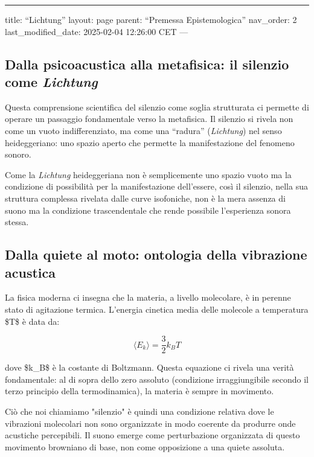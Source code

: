 \documentclass[a4paper,11pt]{article}
\begin{document}
\begin{center}
\rule{3in}{0.4pt}
\end{center}
title: ``Lichtung''
layout: page
parent: ``Premessa Epistemologica''
nav\_order: 2
last\_modified\_date: 2025-02-04 12:26:00 CET
---

\subsection{Dalla psicoacustica alla metafisica: il silenzio come \emph{Lichtung}}\hypertarget{dalla-psicoacustica-alla-metafisica-il-silenzio-come-lichtung}{}\label{dalla-psicoacustica-alla-metafisica-il-silenzio-come-lichtung}

Questa comprensione scientifica del silenzio come soglia strutturata ci
permette di operare un passaggio fondamentale verso la metafisica. Il
silenzio si rivela non come un vuoto indifferenziato, ma come una
``radura'' (\emph{Lichtung}) nel senso heideggeriano: uno spazio aperto che
permette la manifestazione del fenomeno sonoro.

Come la \emph{Lichtung} heideggeriana non è semplicemente uno spazio vuoto ma
la condizione di possibilità per la manifestazione dell'essere, così il
silenzio, nella sua struttura complessa rivelata dalle curve isofoniche,
non è la mera assenza di suono ma la condizione trascendentale che rende
possibile l'esperienza sonora stessa.

\subsection{Dalla quiete al moto: ontologia della vibrazione acustica}\hypertarget{dalla-quiete-al-moto-ontologia-della-vibrazione-acustica}{}\label{dalla-quiete-al-moto-ontologia-della-vibrazione-acustica}

La fisica moderna ci insegna che la materia, a livello molecolare, è in
perenne stato di agitazione termica. L'energia cinetica media delle
molecole a temperatura \$T\$ è data da:

\begin{displaymath}
\langle E_k \rangle = \frac{3}{2}k_BT
\end{displaymath}

dove \$k\_B\$ è la costante di Boltzmann. Questa equazione ci rivela una
verità fondamentale: al di sopra dello zero assoluto (condizione
irraggiungibile secondo il terzo principio della termodinamica), la
materia è sempre in movimento.

Ciò che noi chiamiamo "silenzio" è quindi una condizione relativa dove
le vibrazioni molecolari non sono organizzate in modo coerente da
produrre onde acustiche percepibili. Il suono emerge come perturbazione
organizzata di questo movimento browniano di base, non come opposizione
a una quiete assoluta.
\end{document}

